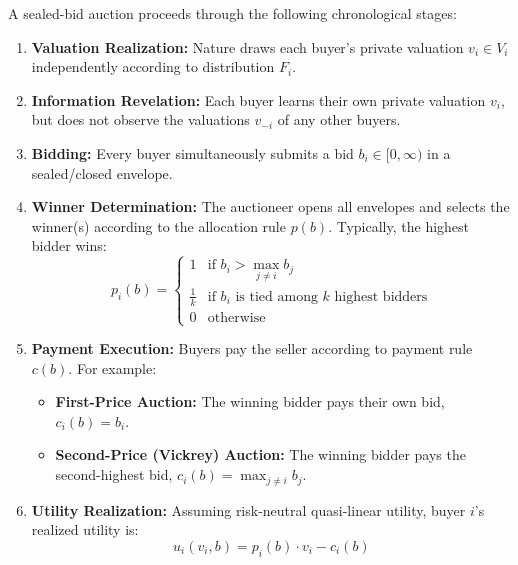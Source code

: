 \documentclass[12pt, a4paper]{article}
\begin{document}
A sealed-bid auction proceeds through the following chronological stages:
\begin{enumerate}
    \item \textbf{Valuation Realization:} Nature draws each buyer's private valuation $v_i \in V_i$ independently according to distribution $F_i$.
    \item \textbf{Information Revelation:} Each buyer learns their own private valuation $v_i$, but does not observe the valuations $v_{-i}$ of any other buyers.
    \item \textbf{Bidding:} Every buyer simultaneously submits a bid $b_i \in [0, \infty)$ in a sealed/closed envelope.
    \item \textbf{Winner Determination:} The auctioneer opens all envelopes and selects the winner(s) according to the allocation rule $p(b)$. Typically, the highest bidder wins:
    \[
      p_i(b) = \begin{cases} 1 & \text{if } b_i > \max_{j \neq i} b_j \\ \frac{1}{k} & \text{if } b_i \text{ is tied among } k \text{ highest bidders} \\ 0 & \text{otherwise} \end{cases}
    \]
    \item \textbf{Payment Execution:} Buyers pay the seller according to payment rule $c(b)$. For example:
    \begin{itemize}
        \item \textbf{First-Price Auction:} The winning bidder pays their own bid, $c_i(b) = b_i$.
        \item \textbf{Second-Price (Vickrey) Auction:} The winning bidder pays the second-highest bid, $c_i(b) = \max_{j \neq i} b_j$.
    \end{itemize}
    \item \textbf{Utility Realization:} Assuming risk-neutral quasi-linear utility, buyer $i$'s realized utility is:
    \[
      u_i(v_i, b) = p_i(b) \cdot v_i - c_i(b)
    \]
\end{enumerate}
\end{document}
